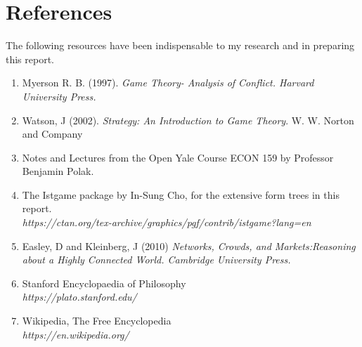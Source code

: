 \documentclass[11pt]{article}
\theoremstyle{definition}
\begin{document}
\section{References}

The following resources have been indispensable to my research and in preparing this report.
\begin{enumerate}
\item Myerson R. B. (1997). \textit{Game Theory- Analysis of Conflict. Harvard University Press.}
\item Watson, J (2002). \textit{Strategy: An Introduction to Game Theory}. W. W. Norton and Company
\item Notes and Lectures from the Open Yale Course ECON 159 by Professor Benjamin Polak.
\item The Istgame package by In-Sung Cho, for the extensive form trees in this report.\\ \textit{https://ctan.org/tex-archive/graphics/pgf/contrib/istgame?lang=en}
\item Easley, D and Kleinberg, J (2010) \textit{Networks, Crowds, and Markets:Reasoning about a Highly Connected World. Cambridge University Press.}
\item Stanford Encyclopaedia of Philosophy\\ \textit{https://plato.stanford.edu/}
\item Wikipedia, The Free Encyclopedia\\ \textit{https://en.wikipedia.org/}

\end{enumerate}
\end{document}
